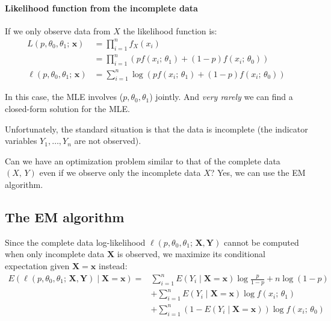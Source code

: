 \paragraph{Likelihood function from the incomplete data}

If we only observe data from $X$ the likelihood function is:
\begin{align*}
	L(p,\theta_0,\theta_1;\,\boldsymbol x)    & = \prod_{i=1}^n f_X(x_i)                                                         \\
	                                          & = \prod_{i=1}^n \left( p f(x_i;\,\theta_1) + (1-p) f(x_i;\,\theta_0) \right)     \\[1em]
	\ell(p,\theta_0,\theta_1;\,\boldsymbol x) & = \sum_{i=1}^n \log \left( p f(x_i;\,\theta_1) + (1-p) f(x_i;\,\theta_0) \right)
\end{align*}

In this case, the MLE involves ($p,\theta_0,\theta_1$) jointly.
And \emph{very rarely} we can find a closed-form solution for the MLE.

Unfortunately, the standard situation is that the data is incomplete
(the indicator variables $Y_1,\dots,Y_n$ are not observed).

\begin{question}{Can we have an optimization problem similar to that of the complete data
		$(X,\,Y)$ even if we observe only the incomplete data $X$?}{}
	Yes, we can use the EM algorithm.
\end{question}

\subsection{The EM algorithm}

Since the complete data log-likelihood $\ell(p,\theta_0,\theta_1;\,\boldsymbol{X},\boldsymbol{Y})$
cannot be computed when only incomplete
data $\boldsymbol{X}$ is observed, we maximize its conditional expectation given
$\boldsymbol{X} = \boldsymbol{x}$ instead:
\begin{align*}
	E \left(\ell(p,\theta_0,\theta_1;\,\boldsymbol{X},\boldsymbol{Y}) \mid \boldsymbol{X}=\boldsymbol{x} \right)
	= & \sum_{i=1}^n E(Y_i \mid \boldsymbol{X}=\boldsymbol{x}) \log \frac{p}{1-p} + n \log (1 - p) \\
	  & + \sum_{i=1}^n E(Y_i \mid \boldsymbol{X}=\boldsymbol{x}) \log f(x_i;\,\theta_1)            \\
	  & + \sum_{i=1}^n (1 - E(Y_i \mid \boldsymbol{X}=\boldsymbol{x})) \log f(x_i;\,\theta_0)
\end{align*}

